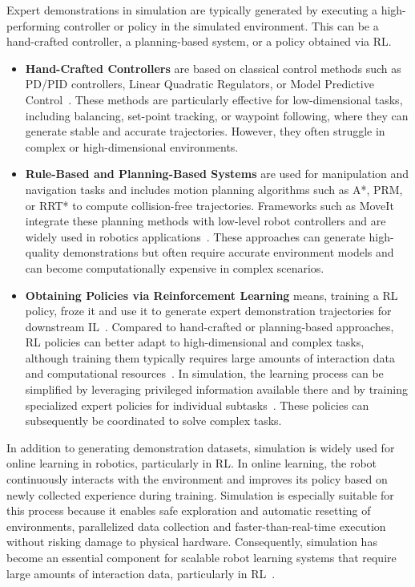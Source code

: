 	Expert demonstrations in simulation are typically generated by executing a high-performing controller or policy in the simulated environment. This can be a hand-crafted controller, a planning-based system, or a policy obtained via \ac{RL}.
	\begin{itemize}
		\item \textbf{Hand-Crafted Controllers} 
		are based on classical control methods such as PD/PID controllers, Linear Quadratic Regulators, or Model Predictive Control~\cite{PredictiveControlTwoWheeled, ModelPredictiveControl2022}. These methods are particularly effective for low-dimensional tasks, including balancing, set-point tracking, or waypoint following, where they can generate stable and accurate trajectories. However, they often struggle in complex or high-dimensional environments.
		\item \textbf{Rule-Based and Planning-Based Systems} 
		are used for manipulation and navigation tasks and includes motion planning algorithms such as A*, PRM, or RRT* to compute collision-free trajectories. Frameworks such as MoveIt~\cite{MoveIt2Documentation} integrate these planning methods with low-level robot controllers and are widely used in robotics applications~\cite{DBLP_journals_corr_abs_2103_12826}. These approaches can generate high-quality demonstrations but often require accurate environment models and can become computationally expensive in complex scenarios.

		\item \textbf{Obtaining Policies via Reinforcement Learning}
		means, training a \ac{RL} policy, froze it and use it to generate expert demonstration trajectories for downstream \ac{IL}~\cite{ParkerHolder2022EvolvingCW, Liang2024EurekaverseEC}. Compared to hand-crafted or planning-based approaches, \ac{RL} policies can better adapt to high-dimensional and complex tasks, although training them typically requires large amounts of interaction data and computational resources~\cite{McCarthy_2025}.
		In simulation, the learning process can be simplified by leveraging privileged information available there and by training specialized expert policies for individual subtasks~\cite{Ha2023ScalingUA, Geng2023UniDexGraspID, Dalal2023ImitatingTA}. These policies can subsequently be coordinated to solve complex tasks.


		
	\end{itemize}


	In addition to generating demonstration datasets, simulation is widely used for online learning in robotics, particularly in \ac{RL}. In online learning, the robot continuously interacts with the environment and improves its policy based on newly collected experience during training. Simulation is especially suitable for this process because it enables safe exploration and automatic resetting of environments, parallelized data collection and faster-than-real-time execution without risking damage to physical hardware. Consequently, simulation has become an essential component for scalable robot learning systems that require large amounts of interaction data, particularly in RL~\cite{Zhuang2023RobotPL, Kaufmann2023ChampionlevelDR, Nasiriany2024RoboCasaLS}.
	
